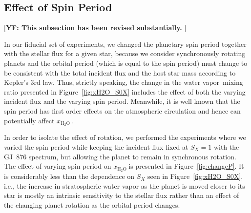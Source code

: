 \documentclass[11pt,numberedappendix,twocolappendix,]{emulateapj}
\def\water{H$_2$O }
\def\xwater{$x_\text{\water}$}
\def\memo#1{\color{red}$[${\bf #1}$]$ \color{black}}
\newcommand{\yf}[1]{{\color{orange}#1}}
\newcommand{\wv}{water vapor\ }
\begin{document}
\subsection{Effect of Spin Period}
\label{ss:sensitivity_Porbit}

\memo{YF: This subsection has been revised substantially. }

In our fiducial set of experiments, we changed the planetary spin period together with the stellar flux for a given star, because we consider synchronously rotating planets and the orbital period (which is equal to the spin period) must change to be consistent with the total incident flux and the host star mass according to Kepler's 3rd law. 
Thus, strictly speaking, the change in the \wv mixing ratio presented in Figure~\ref{fig:xH2O_S0X} includes the effect of both the varying incident flux and the varying spin period. 
Meanwhile, it is well known that the spin period has first order effects on the atmospheric circulation and hence can potentially affect \xwater. 

In order to isolate the effect of rotation, we performed the experiments where we varied the spin period while keeping the incident flux fixed at $S_X=1$ with the GJ~876 spectrum, but allowing the planet to remain in synchronous rotation. 
The effect of varying spin period on \xwater is presented in Figure~\ref{fig:changeP}. 
\yf{It is considerably less than the dependence on $S_X$ seen in Figure~\ref{fig:xH2O_S0X}, i.e., the increase in stratospheric water vapor as the planet is moved closer to its star is mostly an intrinsic sensitivity to the stellar flux rather than an effect of the changing planet rotation as the orbital period changes.} 
\end{document}

